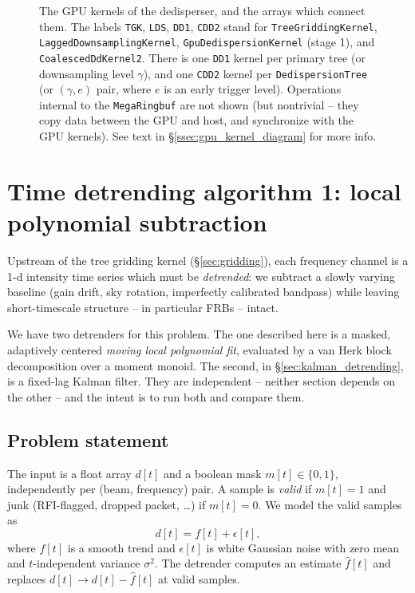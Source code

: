 \documentclass{article}
\numberwithin{equation}{section}   %
\begin{document}
\begin{figure}[ht]
\begin{tikzpicture}
\end{tikzpicture}
\caption{The GPU kernels of the dedisperser, and the arrays which connect them.
The labels {\tt TGK}, {\tt LDS}, {\tt DD1}, {\tt CDD2} stand for
{\tt TreeGriddingKernel}, {\tt LaggedDownsamplingKernel},
{\tt GpuDedispersionKernel} (stage 1), and {\tt CoalescedDdKernel2}.
There is one {\tt DD1} kernel per primary tree (or downsampling level $\gamma$),
and one {\tt CDD2} kernel per {\tt DedispersionTree} (or $(\gamma,e)$ pair, where
$e$ is an early trigger level).
Operations internal to the {\tt MegaRingbuf} are not shown (but nontrivial -- they
copy data between the GPU and host, and synchronize with the GPU kernels).
See text in \S\ref{ssec:gpu_kernel_diagram} for more info.}
\label{fig:gpu_kernels}
\end{figure}

\clearpage

\section{Time detrending algorithm 1: local polynomial subtraction}
\label{sec:time_detrending}

Upstream of the tree gridding kernel (\S\ref{sec:gridding}), each frequency channel is a 1-d intensity time
series which must be {\em detrended}: we subtract a slowly varying baseline (gain drift, sky rotation,
imperfectly calibrated bandpass) while leaving short-timescale structure -- in particular FRBs -- intact.

We have two detrenders for this problem.  The one described here is a masked, adaptively centered {\em moving
local polynomial fit}, evaluated by a van Herk block decomposition over a moment monoid.  The second, in
\S\ref{sec:kalman_detrending}, is a fixed-lag Kalman filter.  They are independent -- neither section depends
on the other -- and the intent is to run both and compare them.

\subsection{Problem statement}
\label{sec:dt_problem}

The input is a float array $d[t]$ and a boolean mask $m[t] \in \{0,1\}$, independently per (beam, frequency)
pair.  A sample is {\em valid} if $m[t]=1$ and junk (RFI-flagged, dropped packet, \ldots) if $m[t]=0$.
We model the valid samples as
\begin{equation}
d[t] = f[t] + \epsilon[t],
\end{equation}
where $f[t]$ is a smooth trend and $\epsilon[t]$ is white Gaussian noise with zero mean and $t$-independent
variance $\sigma^2$.  The detrender computes an estimate $\hat f[t]$ and replaces $d[t] \rightarrow d[t] - \hat f[t]$
at valid samples.
\end{document}

